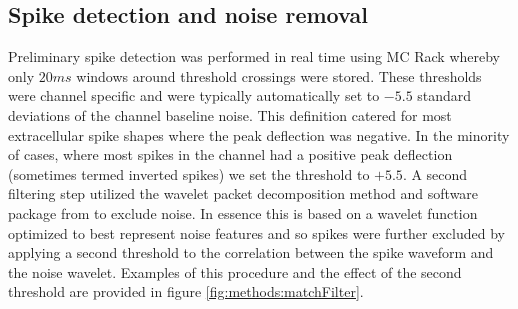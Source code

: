 \label{sec:methods:MEARecording}

\subsection{Spike detection and noise removal}
Preliminary spike detection was performed in real time using MC Rack whereby only \(20 ms\) windows around threshold crossings were stored. These thresholds were channel specific and were typically automatically set to \(-5.5\) standard deviations of the channel baseline noise. This definition catered for most extracellular spike shapes where the peak deflection was negative. In the minority of cases, where most spikes in the channel had a positive peak deflection (sometimes termed inverted spikes) we set the threshold to \(+5.5\). A second filtering step utilized the wavelet packet decomposition method and software package from \cite{hulata2002method} to exclude noise. In essence this is based on a wavelet function optimized to best represent noise features and so spikes were further excluded by applying a second threshold to the correlation between the spike waveform and the noise wavelet. Examples of this procedure and the effect of the second threshold are provided in figure \ref{fig:methods:matchFilter}.

